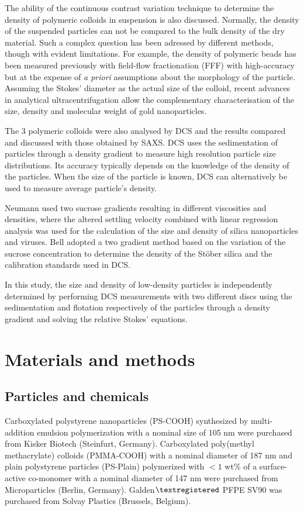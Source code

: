 The ability of the continuous contrast variation technique to determine the density of polymeric colloids in suspension is also discussed. Normally, the density of the suspended particles can not be compared to the bulk density of the dry material. Such a complex question has been adressed by different methods, though with evident limitations. For example, the density of polymeric beads has been measured previously with field-flow fractionation (FFF) with high-accuracy but at the expense of \emph{a priori} assumptions about the morphology of the particle\citep{giddings_density_1981,yang_colloid_1983,caldwell_measurement_1986}. Assuming the Stokes' diameter as the actual size of the colloid, recent advances in analytical ultracentrifugation allow the complementary characterisation of the size, density and molecular weight of gold nanoparticles\citep{carney_determination_2011}.

The 3 polymeric colloids were also analysed by DCS and the results compared and discussed with those obtained by SAXS. DCS uses the sedimentation of particles through a density gradient to measure high resolution particle size distributions\citep{minelli_characterization_2014}. Its accuracy typically depends on the knowledge of the density of the particles. When the size of the particle is known, DCS can alternatively be used to measure average particle's density.

Neumann\citep{neumann_new_2013} used two sucrose gradients resulting in different viscosities and densities, where the altered settling velocity combined with linear regression analysis was used for the calculation of the size and density of silica nanoparticles and viruses. Bell\citep{bell_emerging_2012} adopted a two gradient method based on the variation of the sucrose concentration to determine the density of the St\"ober silica and the calibration standards used in DCS.

In this study, the size and density of low-density particles is independently determined by performing DCS measurements with two different discs using the sedimentation and flotation respectively of the particles through a density gradient and solving the relative Stokes' equations.

\section{Materials and methods}
\subsection{Particles and chemicals}
Carboxylated polystyrene nanoparticles (PS-COOH) synthesized by multi-addition emulsion polymerization with a nominal size of 105 nm were purchased from Kisker Biotech (Steinfurt, Germany). Carboxylated poly(methyl methacrylate) colloids (PMMA-COOH) with a nominal diameter of 187 nm and plain polystyrene particles (PS-Plain) polymerized with $<1$ wt$\%$ of a surface-active co-monomer with a nominal diameter of 147 nm were purchased from Microparticles (Berlin, Germany). Galden$\textregistered$ PFPE SV90 was purchased from Solvay Plastics (Brussels, Belgium).

